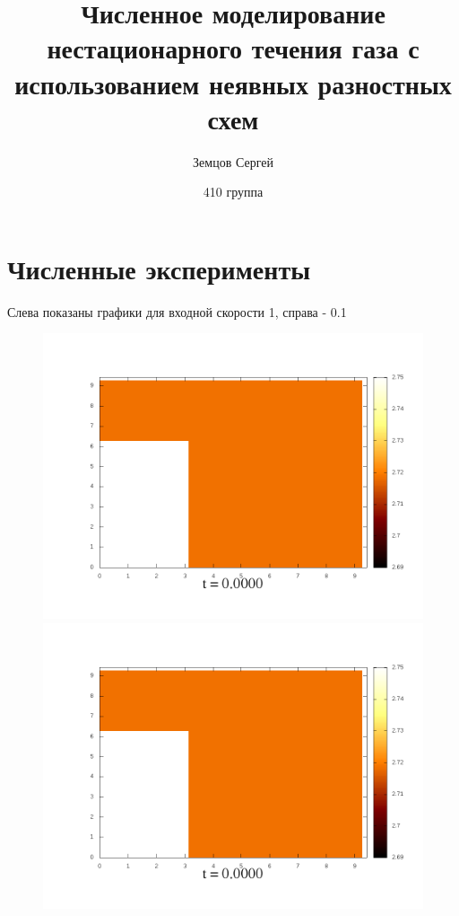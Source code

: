 \documentclass[a4paper, 12pt]{article}
\begin{document}
\title{Численное моделирование нестационарного течения газа с использованием неявных разностных схем}
\author{Земцов Сергей}
\date{410 группа}
\maketitle

\newpage
\tableofcontents
\newpage




\section {Численные эксперименты}
Слева показаны графики для входной скорости 1, справа - 0.1
\begin{figure}[h]
		\begin{minipage}[h]{0.4\linewidth}
			\includegraphics[width=1\linewidth]{./img/01_1_1/G/0}
		\end{minipage}
		\hfill
		\begin{minipage}[h]{0.4\linewidth}
			\includegraphics[width=1\linewidth]{./img/01_1_01/G/0}
		\end{minipage}
\end{figure}
\end{document}
